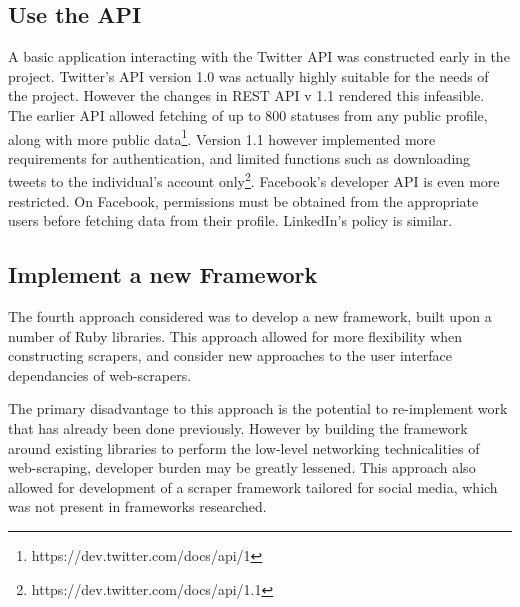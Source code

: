 \subsection{Use the API}

A basic application interacting with the Twitter API was constructed early in the project. Twitter's API version 1.0 was actually highly suitable for the needs of the project. However the changes in REST API v 1.1 rendered this infeasible. The earlier API allowed fetching of up to 800 statuses from any public profile, along with more public data\footnote{https://dev.twitter.com/docs/api/1}. Version 1.1 however implemented more requirements for authentication, and limited functions such as downloading tweets to the individual's account only\footnote{https://dev.twitter.com/docs/api/1.1}. Facebook's developer API is even more restricted. On Facebook, permissions must be obtained from the appropriate users before fetching data from their profile. LinkedIn's policy is similar. %

\subsection{Implement a new Framework}

The fourth approach considered was to develop a new framework, built upon a number of Ruby libraries. This approach allowed for more flexibility when constructing scrapers, and consider new approaches to the user interface dependancies of web-scrapers. 

The primary disadvantage to this approach is the potential to re-implement work that has already been done previously. However by building the framework around existing libraries to perform the low-level networking technicalities of web-scraping, developer burden may be greatly lessened. This approach also allowed for development of a scraper framework tailored for social media, which was not present in frameworks researched.



